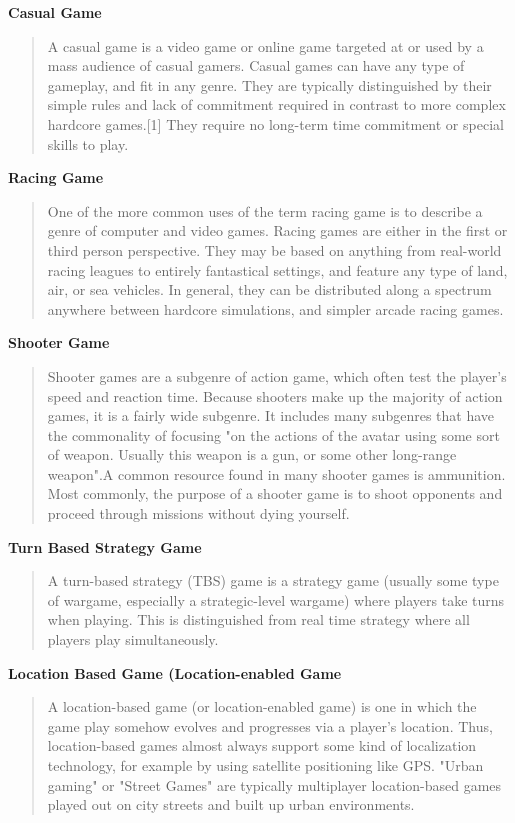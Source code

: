 \textbf{Casual Game}		
	
\begin{quote}
A casual game is a video game or online game targeted at or used by a mass
audience of casual gamers. Casual games can have any type of gameplay, and fit
in any genre. They are typically distinguished by their simple rules and lack of
commitment required in contrast to more complex hardcore games.[1] They require
no long-term time commitment or special skills to play.\cite{thefreedictionary}
\end{quote}

\textbf{Racing Game}
	
\begin{quote}
One of the more common uses of the term racing game is to describe a genre of
computer and video games. Racing games are either in the first or third person
perspective. They may be based on anything from real-world racing leagues to
entirely fantastical settings, and feature any type of land, air, or sea
vehicles. In general, they can be distributed along a spectrum anywhere between
hardcore simulations, and simpler arcade racing games.\cite{thefreedictionary}
\end{quote}
\textbf{Shooter Game}
	
\begin{quote}
Shooter games are a subgenre of action game, which often test the player's speed
and reaction time. Because shooters make up the majority of action games, it is
a fairly wide subgenre. It includes many subgenres that have the commonality of
focusing "on the actions of the avatar using some sort of weapon. Usually this
weapon is a gun, or some other long-range weapon".A common resource found in
many shooter games is ammunition. Most commonly, the purpose of a shooter
game is to shoot opponents and proceed through missions without dying
yourself.\cite{thefreedictionary}
\end{quote}
	
\textbf{Turn Based Strategy Game}
	
\begin{quote}
A turn-based strategy (TBS) game is a strategy game (usually some type of
wargame, especially a strategic-level wargame) where players take turns when
playing. This is distinguished from real time strategy where all players play
simultaneously.\cite{thefreedictionary}
\end{quote}

\textbf{Location Based Game (Location-enabled Game}
	
\begin{quote}
A location-based game (or location-enabled game) is one in which the game play
somehow evolves and progresses via a player's location. Thus, location-based
games almost always support some kind of localization technology, for example by
using satellite positioning like GPS. "Urban gaming" or "Street Games" are
typically multiplayer location-based games played out on city streets and built
up urban environments.\cite{thefreedictionary}
\end{quote}